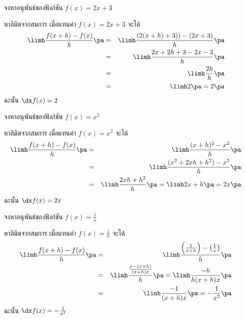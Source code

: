 \begin{frame}[t]
\begin{ex}
จงหาอนุพันธ์ของฟังก์ชัน $f(x) = 2x+3$
\end{ex}
\begin{sol}
\pa หาลิมิตจากสมการ เมื่อแทนค่า $f(x) = 2x+3$ จะได้
\begin{eqnarray*}
\limh \frac{f(x+h) - f(x)}{h} \pa &=& \limh \frac{(2(x+h) + 3)) - (2x+3)}{h} \pa \\
&=& \limh \frac{2x+2h+3-2x-3}{h} \pa \\
&=& \limh \frac{2h}{h} \pa \\
&=& \limh 2 \pa  =2 \pa
\end{eqnarray*}
ฉะนั้น $\dx f(x) = 2$
\end{sol}
\end{frame}


\begin{frame}[t]
\begin{ex}
จงหาอนุพันธ์ของฟังก์ชัน $f(x) = x^2$
\end{ex}
\begin{sol}
\pa หาลิมิตจากสมการ เมื่อแทนค่า $f(x) = x^2$ จะได้
\begin{eqnarray*}
\limh \frac{f(x+h) - f(x)}{h}\pa  &=& \limh \frac{(x+h)^2 - x^2}{h} \pa \\
&=& \limh \frac{(x^2+2xh+h^2) - x^2}{h} \pa \\
&=& \limh \frac{2xh + h^2}{h} \pa = \limh 2x+h \pa = 2x\pa
\end{eqnarray*} 
ฉะนั้น $\dx f(x) = 2x$
\end{sol}
\end{frame}


\begin{frame}[t]
\begin{ex}
จงหาอนุพันธ์ของฟังก์ชัน $f(x) = \frac{1}{x}$
\end{ex}
\begin{sol}
\pa หาลิมิตจากสมการ เมื่อแทนค่า $f(x) =\frac{1}{x}$ จะได้
\begin{eqnarray*}
\limh \frac{f(x+h) - f(x)}{h}\pa  &=& \limh \frac{\left(\frac{1}{x+h}\right) - \left(\frac{1}{x}\right)}{h} \pa \\
&=& \limh \frac{\frac{x - (x+h)}{(x+h)x}}{h} \pa = \limh \frac{-h}{h(x+h)x} \pa \\
&=& \limh \frac{-1}{(x+h)x} \pa = -\frac{1}{x^2} \pa
\end{eqnarray*} 
ฉะนั้น $\dx f(x) = -\frac{1}{x^2}$
\end{sol}
\end{frame}

